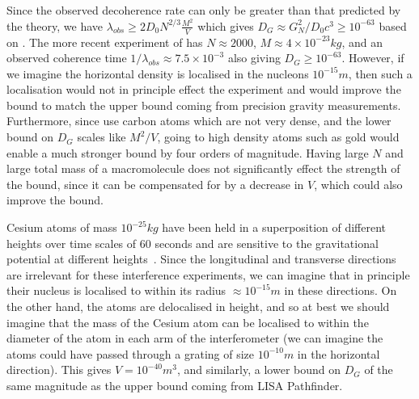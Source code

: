 \documentclass[aps,preprintnumbers,superscriptaddress,longbibliography]{revtex4-1}
\begin{document}
Since the observed decoherence rate can only be greater than that predicted by the theory, we have
$\lambda_{obs}\geq 2D_0N^{2/3}\frac{M^2}{V}$ which gives  $D_G\approx G_N^2 /D_0 c^3  \geq 10^{-63}$ based on \cite{Gerlich2011}.
The more recent experiment of \cite{fein2019quantum} has $N\approx 2000$, $M\approx 4\times 10^{-23}\unit{kg}$, and an observed coherence time $1/\lambda_{obs}\approx 7.5\times 10^{-3}$ also giving $D_G \geq 10^{-63}$. However, if we imagine the horizontal density is localised in the nucleons $10^{-15}\unit{m}$, then such a localisation would not in principle effect the experiment and would improve the bound to match the upper bound coming from precision gravity measurements. Furthermore, since \cite{Gerlich2011,fein2019quantum} use carbon atoms which are not very dense, and the lower bound on $D_G$ scales like $M^2/V$, going to high density atoms such as gold would enable a much stronger bound by four orders of magnitude. Having large $N$ and large total mass of a macromolecule does not significantly effect the strength of the bound, since it can be compensated for by a decrease in $V$, which could also improve the bound. 

Cesium atoms of mass $10^{-25}\unit{kg}$ have been held in a superposition of different heights over time scales of $60$ seconds and are sensitive to the gravitational potential at different heights~\cite{xu2019probing,panda2024coherence}. Since the longitudinal and transverse directions are irrelevant for these interference experiments, we can imagine that in principle their nucleus is localised to within its radius $\approx 10^{-15}\unit{m}$ in these directions. On the other hand, the atoms are delocalised in height, and so at best we should imagine that the mass of the Cesium atom can be localised to within the diameter of the atom in each arm of the interferometer (we can imagine the atoms could have passed through a grating of size $10^{-10}\unit{m}$ in the horizontal direction). This gives $V=10^{-40}\unit{m^3}$, and similarly, a lower bound on $D_G$ of the same magnitude as the upper bound coming from LISA Pathfinder. 
\end{document}
